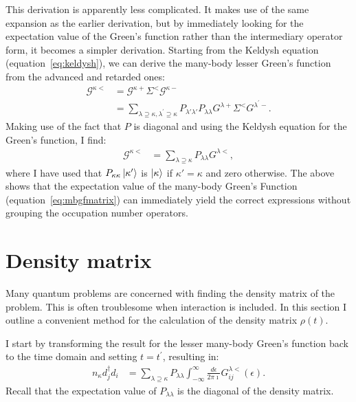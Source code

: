 This derivation is apparently less complicated. It makes use of the same expansion as the earlier derivation, but by immediately looking for the expectation value of the Green's function rather than the intermediary operator form, it becomes a simpler derivation. Starting from the Keldysh equation (equation~\ref{eq:keldysh}), we can derive the many-body lesser Green's function from the advanced and retarded ones:
\begin{align*}
    \mathscr{G}^{\kappa<} &= \mathscr{G}^{\kappa+} \Sigma^< \mathscr{G}^{\kappa-} \\
    &= \sum_{\lambda\supseteq\kappa, \lambda^\prime \supseteq\kappa}P_{\lambda'\lambda'} P_{\lambda\lambda} G^{\lambda+} \Sigma^< G^{\lambda^\prime-}.
\end{align*}
Making use of the fact that $P$ is diagonal and using the Keldysh equation for the Green's function, I find:
\begin{align}
    \mathscr{G}^{\kappa<} &= \sum_{\lambda\supseteq\kappa} P_{\lambda\lambda} G^{\lambda<} \label{eq:mblessergf},
\end{align} where I have used that $P_{\kappa\kappa} \ket{\kappa'}$ is $\ket{\kappa}$ if $\kappa'=\kappa$ and zero otherwise. The above shows that the expectation value of the many-body Green's Function (equation~\ref{eq:mbgfmatrix}) can immediately yield the correct expressions without grouping the occupation number operators.

\section{Density matrix}
Many quantum problems are concerned with finding the density matrix of the problem. This is often troublesome when interaction is included. In this section I outline a convenient method for the calculation of the density matrix $\rho(t)$.

I start by transforming the result for the lesser many-body Green's function back to the time domain and setting $t=t^\prime$, resulting in:
\begin{align}
n_\kappa d_j^\dagger d_i &= \sum_{\lambda\supseteq\kappa} P_{\lambda\lambda} \int^\infty_{-\infty} \frac{d\epsilon}{2\pi\imath} G^{\lambda<}_{ij}(\epsilon) \label{eq:tomatrix}.
\end{align}
Recall that the expectation value of $P_{\lambda\lambda}$ is the diagonal of the density matrix. 

